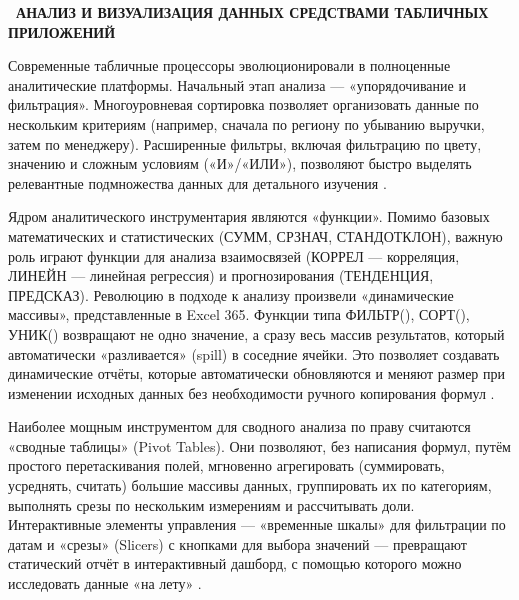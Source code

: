 \documentclass{SibFU-docs}
\begin{document}
\newpage
{}
\begin{center}\textbf{\thesection\ АНАЛИЗ И ВИЗУАЛИЗАЦИЯ ДАННЫХ СРЕДСТВАМИ ТАБЛИЧНЫХ ПРИЛОЖЕНИЙ}\end{center}
\vspace*{-1.5em}

Современные табличные процессоры эволюционировали в полноценные аналитические платформы. Начальный этап анализа --- «упорядочивание и фильтрация». Многоуровневая сортировка позволяет организовать данные по нескольким критериям (например, сначала по региону по убыванию выручки, затем по менеджеру). Расширенные фильтры, включая фильтрацию по цвету, значению и сложным условиям («И»/«ИЛИ»), позволяют быстро выделять релевантные подмножества данных для детального изучения \cite{lakshmi_excel_analysis_2024}.

Ядром аналитического инструментария являются «функции». Помимо базовых математических и статистических (СУММ, СРЗНАЧ, СТАНДОТКЛОН), важную роль играют функции для анализа взаимосвязей (КОРРЕЛ --- корреляция, ЛИНЕЙН --- линейная регрессия) и прогнозирования (ТЕНДЕНЦИЯ, ПРЕДСКАЗ). Революцию в подходе к анализу произвели «динамические массивы», представленные в Excel 365. Функции типа ФИЛЬТР(), СОРТ(), УНИК() возвращают не одно значение, а сразу весь массив результатов, который автоматически «разливается» (spill) в соседние ячейки. Это позволяет создавать динамические отчёты, которые автоматически обновляются и меняют размер при изменении исходных данных без необходимости ручного копирования формул \cite{winston_excel_data_analysis_2016, probstein_data_analytics_excel365_2025}.

Наиболее мощным инструментом для сводного анализа по праву считаются «сводные таблицы» (Pivot Tables). Они позволяют, без написания формул, путём простого перетаскивания полей, мгновенно агрегировать (суммировать, усреднять, считать) большие массивы данных, группировать их по категориям, выполнять срезы по нескольким измерениям и рассчитывать доли. Интерактивные элементы управления --- «временные шкалы» для фильтрации по датам и «срезы» (Slicers) с кнопками для выбора значений --- превращают статический отчёт в интерактивный дашборд, с помощью которого можно исследовать данные «на лету» \cite{probstein_data_analytics_excel365_2025}.

\end{document}
